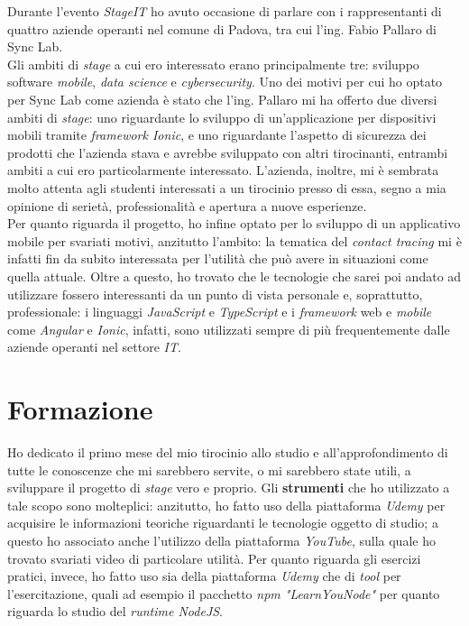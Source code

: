 Durante l'evento \textit{StageIT} ho avuto occasione di parlare con i rappresentanti di quattro aziende operanti nel comune di Padova, tra cui l'ing. Fabio Pallaro di Sync Lab. \\
Gli ambiti di \textit{stage} a cui ero interessato erano principalmente tre: sviluppo software \textit{mobile}, \textit{data science} e \textit{cybersecurity}. Uno dei motivi per cui ho optato per Sync Lab come azienda è stato che l'ing. Pallaro mi ha offerto due diversi ambiti di \textit{stage}: uno riguardante lo sviluppo di un'applicazione per dispositivi mobili tramite \textit{framework Ionic}, e uno riguardante l'aspetto di sicurezza dei prodotti che l'azienda stava e avrebbe sviluppato con altri tirocinanti, entrambi ambiti a cui ero particolarmente interessato. L'azienda, inoltre, mi è sembrata molto attenta agli studenti interessati a un tirocinio presso di essa, segno a mia opinione di serietà, professionalità e apertura a nuove esperienze. \\
Per quanto riguarda il progetto, ho infine optato per lo sviluppo di un applicativo mobile per svariati motivi, anzitutto l'ambito: la tematica del \textit{contact tracing} mi è infatti fin da subito interessata per l'utilità che può avere in situazioni come quella attuale. Oltre a questo, ho trovato che le tecnologie che sarei poi andato ad utilizzare fossero interessanti da un punto di vista personale e, soprattutto, professionale: i linguaggi \textit{JavaScript} e \textit{TypeScript} e i \textit{framework} web e \textit{mobile} come \textit{Angular} e \textit{Ionic}, infatti, sono utilizzati sempre di più frequentemente dalle aziende operanti nel settore \textit{IT}.


\section{Formazione}

Ho dedicato il primo mese del mio tirocinio allo studio e all'approfondimento di tutte le conoscenze che mi sarebbero servite, o mi sarebbero state utili, a sviluppare il progetto di \textit{stage} vero e proprio. Gli \textbf{strumenti} che ho utilizzato a tale scopo sono molteplici: anzitutto, ho fatto uso della piattaforma \textit{Udemy} per acquisire le informazioni teoriche riguardanti le tecnologie oggetto di studio; a questo ho associato anche l'utilizzo della piattaforma \textit{YouTube}, sulla quale ho trovato svariati video di particolare utilità. Per quanto riguarda gli esercizi pratici, invece, ho fatto uso sia della piattaforma \textit{Udemy} che di \textit{tool} per l'esercitazione, quali ad esempio il pacchetto \textit{npm "LearnYouNode"} per quanto riguarda lo studio del \textit{runtime NodeJS}. \\

